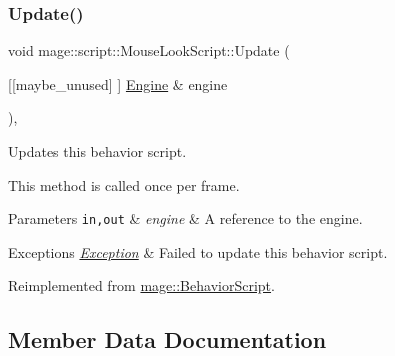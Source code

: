 \mbox{\label{classmage_1_1script_1_1_mouse_look_script_a3b78aebd104b061f5d176843ef58a48a}} 
\subsubsection{\texorpdfstring{Update()}{Update()}}
{\footnotesize\ttfamily void mage\+::script\+::\+Mouse\+Look\+Script\+::\+Update (\begin{DoxyParamCaption}\item[{\mbox{[}\mbox{[}maybe\+\_\+unused\mbox{]} \mbox{]} \mbox{\hyperlink{classmage_1_1_engine}{Engine}} \&}]{engine }\end{DoxyParamCaption})\hspace{0.3cm}{\ttfamily [override]}, {\ttfamily [virtual]}}

Updates this behavior script.

This method is called once per frame.


\begin{DoxyParams}[1]{Parameters}
\mbox{\tt in,out}  & {\em engine} & A reference to the engine. \\
\hline
\end{DoxyParams}

\begin{DoxyExceptions}{Exceptions}
{\em \mbox{\hyperlink{classmage_1_1_exception}{Exception}}} & Failed to update this behavior script. \\
\hline
\end{DoxyExceptions}


Reimplemented from \mbox{\hyperlink{classmage_1_1_behavior_script_a085634661326b59850c1111e537baa4e}{mage\+::\+Behavior\+Script}}.



\subsection{Member Data Documentation}
\mbox{\label{classmage_1_1script_1_1_mouse_look_script_ae41f05d545c70cd621a405f6ef0cd4d5}} 
